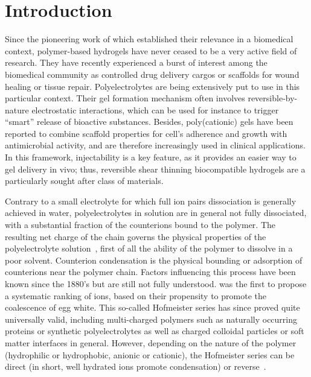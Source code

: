 \documentclass[twoside,twocolumn,9pt]{article}
\begin{document}
\section{Introduction}
Since the pioneering work of \citet{Wichterle1960} which established their relevance in a biomedical context, polymer-based hydrogels have never ceased to be a very active field of research\cite{Calo2015,Hoffman2001}. They have recently experienced a burst of interest among the biomedical community as controlled drug delivery cargos or scaffolds for wound healing or tissue repair\cite{Vashist2014,Ratner2004}. Polyelectrolytes are being extensively put to use in this particular context\cite{Rosso2003,BinImran2014}. Their gel formation mechanism often involves reversible-by-nature electrostatic interactions, which can be used for instance to trigger ``smart'' release of bioactive substances\cite{Khare1993,Lockwood2007}. Besides, poly(cationic) gels have been reported to combine scaffold properties for cell’s adherence and growth with antimicrobial activity, and are therefore increasingly used in clinical applications\cite{Hoffman2001,Landers2002}. In this framework, injectability is a key feature, as it provides an easier way to gel delivery in vivo\cite{Tibbitt2016}; thus, reversible shear thinning biocompatible hydrogels are a particularly sought after class of materials\cite{Yu2008}.


Contrary to a small electrolyte for which full ion pairs dissociation is generally achieved in water, polyelectrolytes in solution are in general not fully dissociated, with a substantial fraction of the counterions bound to the polymer\cite{Manning1979}. The resulting net charge of the chain governs the physical properties of the polyelectrolyte solution~\cite{DeGennes1976,Khokhlov1980,Raphael1990,Dobrynin1995,Rubinstein1996}, first of all the ability of the polymer to dissolve in a poor solvent. Counterion condensation is the physical bounding or adsorption of counterions near the polymer chain. Factors influencing this process have been known since the 1880's but are still not fully understood. \citet{Hofmeister1888} was the first to propose a systematic ranking of ions, based on their propensity to promote the coalescence of egg white. This so-called Hofmeister series has since proved quite universally valid\cite{Zhang2010a}, including multi-charged polymers such as naturally occurring proteins or synthetic polyelectrolytes as well as charged colloidal particles\cite{Schwierz2010,Oncsik2015} or soft matter interfaces in general\cite{Leontidis2014}. However, depending on the nature of the polymer (hydrophilic or hydrophobic, anionic or cationic), the Hofmeister series can be direct (in short, well hydrated ions promote condensation) or reverse~\cite{Schwierz2010,Oncsik2015}.
\end{document}
